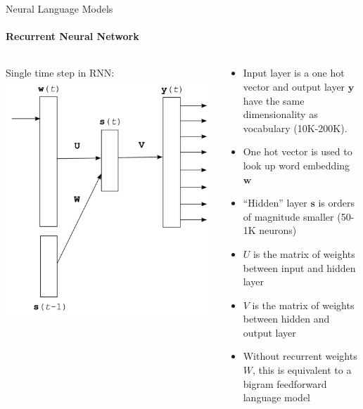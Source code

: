 \begin{frame}{Neural Language Models}
\framesubtitle{Recurrent Neural Network}
\begin{columns}
\begin{column}{0.4\textwidth}
\begin{block}{Single time step in RNN:}
\includegraphics[scale=0.3]{figures/nlm/mikolovrnn.png}
\end{block}
\end{column}
\begin{column}{0.6\textwidth}
{\small
\begin{itemize}[<+->]
	\item Input layer is a one hot vector and output layer $\mathbf{y}$ have the same dimensionality as vocabulary (10K-200K). 
	\item One hot vector is used to look up word embedding $\mathbf{w}$
	\item ``Hidden'' layer $\mathbf{s}$ is orders of magnitude smaller (50-1K neurons)
	\item $U$ is the matrix of weights between input and hidden layer
	\item $V$ is the matrix of weights between hidden and output layer
	\item Without recurrent weights $W$, this is equivalent to a bigram feedforward language model
\end{itemize}
}
\end{column}
\end{columns}
\end{frame}

